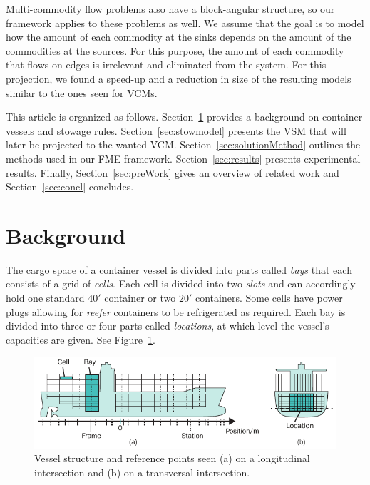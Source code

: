 \documentclass[citeauthoryear]{llncs}
\begin{document}
Multi-commodity flow problems also have a block-angular structure, so our framework applies to these problems as well. We assume that the goal is to model how the amount of each commodity at the sinks depends on the amount of the commodities at the sources. For this purpose, the amount of each commodity that flows on edges is irrelevant and eliminated from the system. 
For this projection, we found a speed-up and a reduction in size of the resulting models similar to the ones seen for VCMs.

This article is organized as follows. Section~\ref{sec:background} provides a background on container vessels and stowage rules. Section~\ref{sec:stowmodel} presents the VSM that will later be projected to the wanted VCM. Section~\ref{sec:solutionMethod} outlines the methods used in our FME framework. Section~\ref{sec:results} presents experimental results. Finally, Section~\ref{sec:preWork} gives an overview of related work and Section~\ref{sec:concl} concludes.

\section{Background} \label{sec:background}

The cargo space of a container vessel is divided into parts called \textit{bays} that each consists of a grid of \emph{cells}. Each cell is divided into two \emph{slots} and can accordingly hold one standard $40'$ container or two $20'$ containers. Some cells have power plugs allowing for \emph{reefer} containers to be refrigerated as required. Each bay is divided into three or four parts called \textit{locations}, at which level the vessel's capacities are given. See Figure~\ref{fig:vessel}.

\begin{figure}[htbp]
	\centering
		\includegraphics{figures/vessel3.pdf}
	\caption{Vessel structure and reference points seen (a) on a longitudinal intersection and (b) on a transversal intersection.}
	\label{fig:vessel}
\end{figure}
\end{document}
